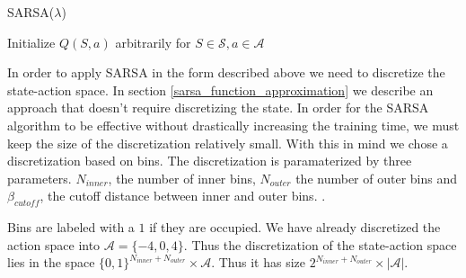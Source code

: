 \documentclass{article}
\begin{document}
\begin{algorithm}[H]
   \caption{SARSA($\lambda$)}
   \label{alg:SARSA}
\begin{algorithmic}
   \STATE Initialize $Q(S,a)$ arbitrarily for $S \in \mathcal{S}, a \in \mathcal{A}$
   \REPEAT

\end{algorithmic}
\end{algorithm}




In order to apply SARSA in the form described above we need to discretize the state-action space. In section \ref{sarsa_function_approximation} we describe an approach that doesn't require discretizing the state. In order for the SARSA algorithm to be effective without drastically increasing the training time, we must keep the size of the discretization relatively small. With this in mind we chose a discretization based on bins. The discretization is paramaterized by three parameters. $N_{inner}$, the number of inner bins, $N_{outer}$ the number of outer bins and $\beta_{cutoff}$, the cutoff distance between inner and outer bins. .


Bins are labeled with a $1$ if they are occupied. We have already discretized the action space into $\mathcal{A} = \{-4,0,4\}$. Thus the discretization of the state-action space lies in the space $\{0,1\}^{N_{inner} + N_{outer}} \times \mathcal{A}$. Thus it has size $2^{N_{inner} + N_{outer}} \times |\mathcal{A}|$.
\end{document}
